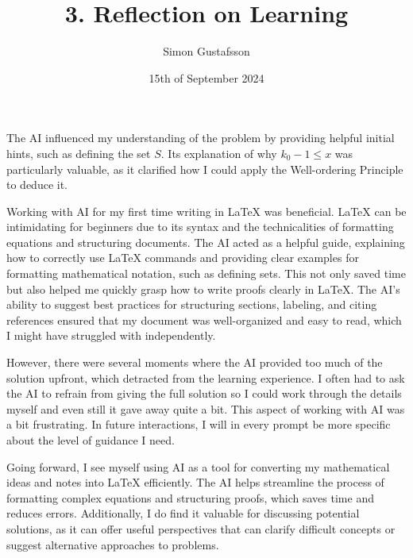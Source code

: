 \documentclass{article}
\title{3. Reflection on Learning}
\author{Simon Gustafsson}
\date{15th of September 2024}
\begin{document}
\maketitle

The AI influenced my understanding of the problem by providing helpful initial hints, such as defining the set \( S \). Its explanation of why \( k_0 - 1 \leq x \) was particularly valuable, as it clarified how I could apply the Well-ordering Principle to deduce it.

Working with AI for my first time writing in LaTeX was beneficial. LaTeX can be intimidating for beginners due to its syntax and the technicalities of formatting equations and structuring documents. The AI acted as a helpful guide, explaining how to correctly use LaTeX commands and providing clear examples for formatting mathematical notation, such as defining sets. This not only saved time but also helped me quickly grasp how to write proofs clearly in LaTeX. The AI's ability to suggest best practices for structuring sections, labeling, and citing references ensured that my document was well-organized and easy to read, which I might have struggled with independently.

However, there were several moments where the AI provided too much of the solution upfront, which detracted from the learning experience. I often had to ask the AI to refrain from giving the full solution so I could work through the details myself and even still it gave away quite a bit. This aspect of working with AI was a bit frustrating. In future interactions, I will in every prompt be more specific about the level of guidance I need.

Going forward, I see myself using AI as a tool for converting my mathematical ideas and notes into LaTeX efficiently. The AI helps streamline the process of formatting complex equations and structuring proofs, which saves time and reduces errors. Additionally, I do find it valuable for discussing potential solutions, as it can offer useful perspectives that can clarify difficult concepts or suggest alternative approaches to problems.
\end{document}
